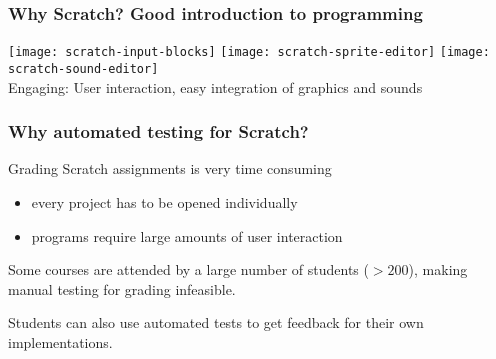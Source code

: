 \begin{frame}\frametitle{Why Scratch? Good introduction to programming}
    \centering
    \texttt{[image: scratch-input-blocks]}
    \texttt{[image: scratch-sprite-editor]}
    \texttt{[image: scratch-sound-editor]}\\[\medskipamount]
    Engaging: User interaction, easy integration of graphics and sounds
\end{frame}

\begin{frame}
\end{frame}

\begin{frame}\frametitle{Why automated testing for Scratch?}
    Grading Scratch assignments is very \textcolor{upfim}{time consuming}
    \begin{itemize}
        \item every project has to be opened individually
        \item programs require large amounts of \textcolor{upfim}{user interaction}
    \end{itemize}

    \bigskip

    Some courses are attended by a \textcolor{upfim}{large number of students ($> 200$)},
    making manual testing for grading infeasible.

    \bigskip

    Students can also use automated tests to get feedback for their own implementations.
\end{frame}
